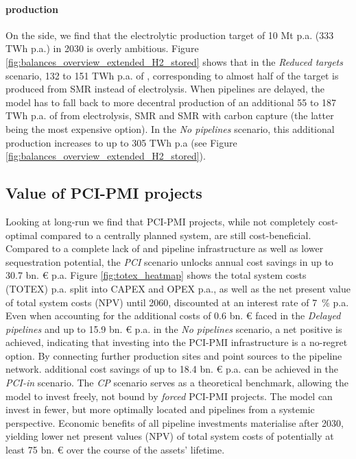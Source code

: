 \documentclass[preprint,12pt,sort&compress]{elsarticle}
\begin{document}
\paragraph{ production} 
On the  side, we find that the electrolytic  production target of 10 Mt p.a. (333 TWh p.a.) in 2030 is overly ambitious. Figure \ref{fig:balances_overview_extended_H2_stored} shows that in the \textit{Reduced targets} scenario, 132 to 151 TWh p.a. of , corresponding to almost half of the target is produced from SMR instead of electrolysis. When pipelines are delayed, the model has to fall back to more decentral  production of an additional 55 to 187 TWh p.a. of  from electrolysis, SMR and SMR with carbon capture (the latter being the most expensive option). In the \textit{No pipelines} scenario, this additional  production increases to up to 305 TWh p.a (see Figure \ref{fig:balances_overview_extended_H2_stored}).

\subsection{Value of PCI-PMI projects}
\label{sec:value_of_pcipmi_projects}
Looking at long-run we find that PCI-PMI projects, while not completely cost-optimal compared to a centrally planned system, are still cost-beneficial. Compared to a complete lack of  and  pipeline infrastructure as well as lower  sequestration potential, the \textit{PCI} scenario unlocks annual cost savings in up to 30.7 bn. \euro{} p.a. Figure \ref{fig:totex_heatmap} shows the total system costs (TOTEX) p.a. split into CAPEX and OPEX p.a., as well as the net present value of total system costs (NPV) until 2060, discounted at an interest rate of \SI{7}{\percent} p.a.
Even when accounting for the additional costs of 0.6 bn. \euro{} faced in the \textit{Delayed pipelines} and up to 15.9 bn. \euro{} p.a. in the \textit{No pipelines} scenario, a net positive is achieved, indicating that investing into the PCI-PMI infrastructure is a no-regret option. By connecting further  production sites and  point sources to the pipeline network. additional cost savings of up to 18.4 bn. \euro{} p.a. can be achieved in the \textit{PCI-in} scenario. The \textit{CP} scenario serves as a theoretical benchmark, allowing the model to invest freely, not bound by \textit{forced} PCI-PMI projects. The model can invest in fewer, but more optimally located  and  pipelines from a systemic perspective. Economic benefits of all pipeline investments materialise after 2030, yielding lower net present values (NPV) of total system costs of potentially at least 75 bn. \euro{} over the course of the assets' lifetime. 
\end{document}
